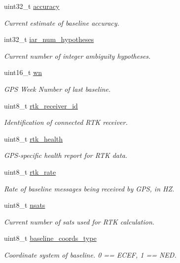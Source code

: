 \begin{DoxyCompactItemize}
uint32\+\_\+t \hyperlink{struct____mavlink__gps__rtk__t_a0d8bd42ee6ca806000b1eae16eb3c48c}{accuracy}
\begin{DoxyCompactList}\small\item\em Current estimate of baseline accuracy. \end{DoxyCompactList}\item 
int32\+\_\+t \hyperlink{struct____mavlink__gps__rtk__t_acab1b91b3c3532278f0d59182cd24e0a}{iar\+\_\+num\+\_\+hypotheses}
\begin{DoxyCompactList}\small\item\em Current number of integer ambiguity hypotheses. \end{DoxyCompactList}\item 
uint16\+\_\+t \hyperlink{struct____mavlink__gps__rtk__t_a20e9a0be6eb85fbc446f58348742bf24}{wn}
\begin{DoxyCompactList}\small\item\em G\+P\+S Week Number of last baseline. \end{DoxyCompactList}\item 
uint8\+\_\+t \hyperlink{struct____mavlink__gps__rtk__t_ab5d3c64c1938509de9b8c355033c7700}{rtk\+\_\+receiver\+\_\+id}
\begin{DoxyCompactList}\small\item\em Identification of connected R\+T\+K receiver. \end{DoxyCompactList}\item 
uint8\+\_\+t \hyperlink{struct____mavlink__gps__rtk__t_a72ee83d62b7f45e973224b274c13928f}{rtk\+\_\+health}
\begin{DoxyCompactList}\small\item\em G\+P\+S-\/specific health report for R\+T\+K data. \end{DoxyCompactList}\item 
uint8\+\_\+t \hyperlink{struct____mavlink__gps__rtk__t_a9dd843840b83bfd7dd0738cb1b691365}{rtk\+\_\+rate}
\begin{DoxyCompactList}\small\item\em Rate of baseline messages being received by G\+P\+S, in H\+Z. \end{DoxyCompactList}\item 
uint8\+\_\+t \hyperlink{struct____mavlink__gps__rtk__t_a2145b942317800aaba0b6d58745551c2}{nsats}
\begin{DoxyCompactList}\small\item\em Current number of sats used for R\+T\+K calculation. \end{DoxyCompactList}\item 
uint8\+\_\+t \hyperlink{struct____mavlink__gps__rtk__t_ac2b2d6dd6676ce72dbf7b0b012c40978}{baseline\+\_\+coords\+\_\+type}
\begin{DoxyCompactList}\small\item\em Coordinate system of baseline. 0 == E\+C\+E\+F, 1 == N\+E\+D. \end{DoxyCompactList}\end{DoxyCompactItemize}


